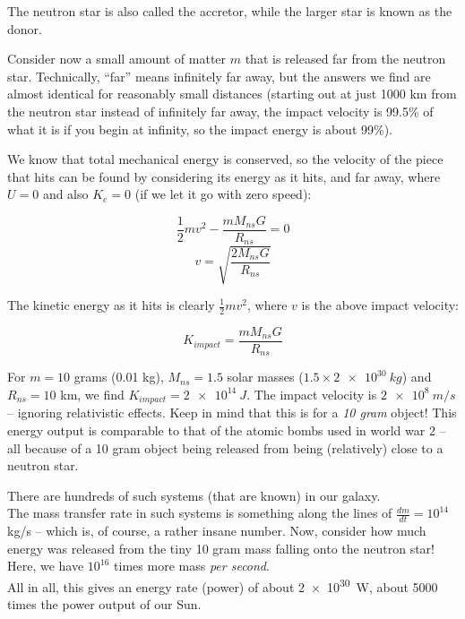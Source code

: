 \documentclass[8.01x]{subfiles}
\begin{document}
The neutron star is also called the accretor, while the larger star is known as the donor.

Consider now a small amount of matter $m$ that is released far from the neutron star. Technically, ``far'' means infinitely far away, but the answers we find are almost identical for reasonably small distances (starting out at just 1000 km from the neutron star instead of infinitely far away, the impact velocity is 99.5\% of what it is if you begin at infinity, so the impact energy is about 99\%).

We know that total mechanical energy is conserved, so the velocity of the piece that hits can be found by considering its energy as it hits, and far away, where $U = 0$ and also $K_e = 0$ (if we let it go with zero speed):

\begin{equation}
\frac{1}{2} m v^2 - \frac{m M_{ns} G}{R_{ns}} = 0
\end{equation}
\begin{equation}
v = \sqrt{\frac{2 M_{ns} G}{R_{ns}}}
\end{equation}

The kinetic energy as it hits is clearly $\displaystyle \frac{1}{2} m v^2$, where $v$ is the above impact velocity:

\begin{equation}
K_{impact} = \frac{m M_{ns} G}{R_{ns}}
\end{equation}

For $m = 10$ grams (0.01 kg), $M_{ns} = 1.5$ solar masses ($1.5 \times \SI{2e30}{kg}$) and $R_{ns} = 10$ km, we find $K_{impact} = \SI{2e14}{J}$. The impact velocity is $\SI{2e8}{m/s}$ -- ignoring relativistic effects. Keep in mind that this is for a \emph{10 gram} object! This energy output is comparable to that of the atomic bombs used in world war 2 -- all because of a 10 gram object being released from being (relatively) close to a neutron star.

There are hundreds of such systems (that are known) in our galaxy.\\
The mass transfer rate in such systems is something along the lines of $\displaystyle \frac{dm}{dt} = 10^{14}$ kg/s -- which is, of course, a rather insane number. Now, consider how much energy was released from the tiny 10 gram mass falling onto the neutron star! Here, we have $10^{16}$ times more mass \emph{per second}.\\
All in all, this gives an energy rate (power) of about \SI{2e30}{W}, about 5000 times the power output of our Sun.
\end{document}
